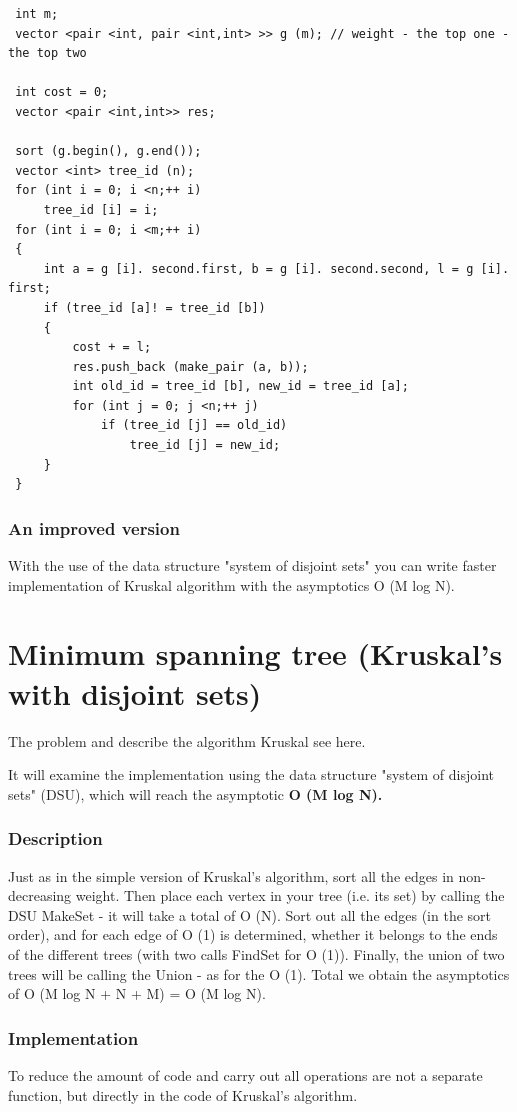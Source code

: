 \begin{verbatim}
 int m;
 vector <pair <int, pair <int,int> >> g (m); // weight - the top one - the top two

 int cost = 0;
 vector <pair <int,int>> res;

 sort (g.begin(), g.end());
 vector <int> tree_id (n);
 for (int i = 0; i <n;++ i)
     tree_id [i] = i;
 for (int i = 0; i <m;++ i)
 {
     int a = g [i]. second.first, b = g [i]. second.second, l = g [i]. first;
     if (tree_id [a]! = tree_id [b])
     {
         cost + = l;
         res.push_back (make_pair (a, b));
         int old_id = tree_id [b], new_id = tree_id [a];
         for (int j = 0; j <n;++ j)
             if (tree_id [j] == old_id)
                 tree_id [j] = new_id;
     }
 } 
\end{verbatim}

\subsubsection{ An improved version }
With the use of the data structure "system of disjoint sets" you can write faster implementation of Kruskal algorithm with the asymptotics O (M log N).

\section{ Minimum spanning tree (Kruskal's with disjoint sets) }
The problem and describe the algorithm Kruskal see here.

It will examine the implementation using the data structure "system of disjoint sets" (DSU), which will reach the asymptotic \textbf{O (M log N).}

\subsubsection{ Description }
Just as in the simple version of Kruskal's algorithm, sort all the edges in non-decreasing weight. Then place each vertex in your tree (i.e. its set) by calling the DSU MakeSet - it will take a total of O (N). Sort out all the edges (in the sort order), and for each edge of O (1) is determined, whether it belongs to the ends of the different trees (with two calls FindSet for O (1)). Finally, the union of two trees will be calling the Union - as for the O (1). Total we obtain the asymptotics of O (M log N + N + M) = O (M log N).

\subsubsection{ Implementation }
To reduce the amount of code and carry out all operations are not a separate function, but directly in the code of Kruskal's algorithm.

